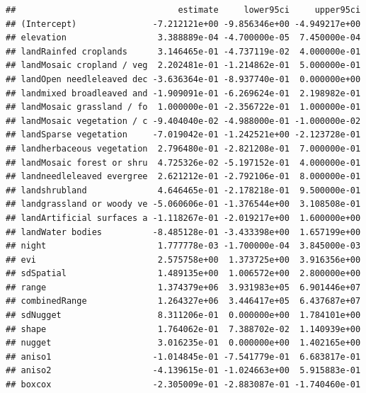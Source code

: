 \documentclass[
]{article}
\newenvironment{Shaded}{\begin{snugshade}}{\end{snugshade}}
\newcommand{\NormalTok}[1]{#1}
\newcommand{\SpecialCharTok}[1]{\textcolor[rgb]{0.81,0.36,0.00}{\textbf{#1}}}
\begin{document}
\begin{Shaded}
\end{Shaded}

\begin{verbatim}
##                                estimate     lower95ci     upper95ci
## (Intercept)               -7.212121e+00 -9.856346e+00 -4.949217e+00
## elevation                  3.388889e-04 -4.700000e-05  7.450000e-04
## landRainfed croplands      3.146465e-01 -4.737119e-02  4.000000e-01
## landMosaic cropland / veg  2.202481e-01 -1.214862e-01  5.000000e-01
## landOpen needleleaved dec -3.636364e-01 -8.937740e-01  0.000000e+00
## landmixed broadleaved and -1.909091e-01 -6.269624e-01  2.198982e-01
## landMosaic grassland / fo  1.000000e-01 -2.356722e-01  1.000000e-01
## landMosaic vegetation / c -9.404040e-02 -4.988000e-01 -1.000000e-02
## landSparse vegetation     -7.019042e-01 -1.242521e+00 -2.123728e-01
## landherbaceous vegetation  2.796480e-01 -2.821208e-01  7.000000e-01
## landMosaic forest or shru  4.725326e-02 -5.197152e-01  4.000000e-01
## landneedleleaved evergree  2.621212e-01 -2.792106e-01  8.000000e-01
## landshrubland              4.646465e-01 -2.178218e-01  9.500000e-01
## landgrassland or woody ve -5.060606e-01 -1.376544e+00  3.108508e-01
## landArtificial surfaces a -1.118267e-01 -2.019217e+00  1.600000e+00
## landWater bodies          -8.485128e-01 -3.433398e+00  1.657199e+00
## night                      1.777778e-03 -1.700000e-04  3.845000e-03
## evi                        2.575758e+00  1.373725e+00  3.916356e+00
## sdSpatial                  1.489135e+00  1.006572e+00  2.800000e+00
## range                      1.374379e+06  3.931983e+05  6.901446e+07
## combinedRange              1.264327e+06  3.446417e+05  6.437687e+07
## sdNugget                   8.311206e-01  0.000000e+00  1.784101e+00
## shape                      1.764062e-01  7.388702e-02  1.140939e+00
## nugget                     3.016235e-01  0.000000e+00  1.402165e+00
## aniso1                    -1.014845e-01 -7.541779e-01  6.683817e-01
## aniso2                    -4.139615e-01 -1.024663e+00  5.915883e-01
## boxcox                    -2.305009e-01 -2.883087e-01 -1.740460e-01
\end{verbatim}

\begin{Shaded}
\end{Shaded}
\end{document}
